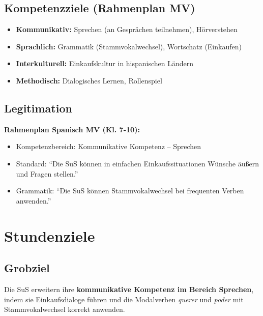 \documentclass[11pt,a4paper]{article}
\begin{document}
\subsection{Kompetenzziele (Rahmenplan MV)}
\begin{itemize}
    \item \textbf{Kommunikativ:} Sprechen (an Gesprächen teilnehmen), Hörverstehen
    \item \textbf{Sprachlich:} Grammatik (Stammvokalwechsel), Wortschatz (Einkaufen)
    \item \textbf{Interkulturell:} Einkaufskultur in hispanischen Ländern
    \item \textbf{Methodisch:} Dialogisches Lernen, Rollenspiel
\end{itemize}

\subsection{Legitimation}
\textbf{Rahmenplan Spanisch MV (Kl. 7-10):}
\begin{itemize}
    \item Kompetenzbereich: Kommunikative Kompetenz -- Sprechen
    \item Standard: ``Die SuS können in einfachen Einkaufssituationen Wünsche äußern und Fragen stellen.''
    \item Grammatik: ``Die SuS können Stammvokalwechsel bei frequenten Verben anwenden.''
\end{itemize}

\section{Stundenziele}

\subsection{Grobziel}
Die SuS erweitern ihre \textbf{kommunikative Kompetenz im Bereich Sprechen}, indem sie Einkaufsdialoge führen und die Modalverben \textit{querer} und \textit{poder} mit Stammvokalwechsel korrekt anwenden.
\end{document}
